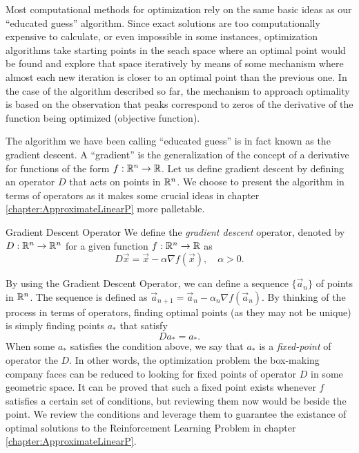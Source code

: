 Most computational methods for optimization rely on the same basic ideas as our
``educated guess'' algorithm. Since exact solutions are too computationally
expensive to calculate, or even impossible in some instances, optimization
algorithms take starting points in the seach space where an optimal point would
be found and explore that space iteratively by means of some mechanism where
almost each new iteration is closer to an optimal point than the previous one.
In the case of the algorithm described so far, the mechanism to approach
optimality is based on the observation that peaks correspond to zeros of the
derivative of the function being optimized (objective function).

The algorithm we have been calling ``educated guess'' is in fact known as the
gradient descent. A ``gradient'' is the generalization of the concept of a
derivative for functions of the form $f: \mathbb{R}^{n} \to \mathbb{R}$. Let us define gradient
descent by defining an operator $D$ that acts on points in $\mathbb{R}^{n}$. We choose
to present the algorithm in terms of operators as it makes some crucial ideas in
chapter \ref{chapter:ApproximateLinearP} more palletable.

\begin{dfn}{Gradient Descent Operator}{}
    We define the \emph{gradient descent} operator, denoted by $D: \mathbb{R}^{n} \to
    \mathbb{R}^{n}$ for a given function $f: \mathbb{R}^{n} \to \mathbb{R}$ as
    \[
        D \vec{x} = \vec{x} - \alpha \nabla f(\vec{x}), \quad \alpha > 0.
    \]
\end{dfn}

By using the Gradient Descent Operator, we can define a sequence
$\{\vec{a}_n\}$ of points in $\mathbb{R}^{n}$. The sequence is defined as
$\vec{a}_{n+1} = \vec{a}_n - \alpha_n \nabla f(\vec{a}_n)$. By thinking of the
process in terms of operators, finding optimal points (as they may not be
unique) is simply finding points $a_*$ that satisfy
\[
    D a_* = a_*.
\]
When some $a_*$ satisfies the condition above, we say that $a_*$ is a
\emph{fixed-point} of operator the $D$. In other words, the optimization problem
the box-making company faces can be reduced to looking for fixed points of
operator $D$ in some geometric space. It can be proved that such a fixed point
exists whenever $f$ satisfies a certain set of conditions, but reviewing them
now would be beside the point. We review the conditions and leverage them to
guarantee the existance of optimal solutions to the Reinforcement Learning
Problem in chapter \ref{chapter:ApproximateLinearP}.

